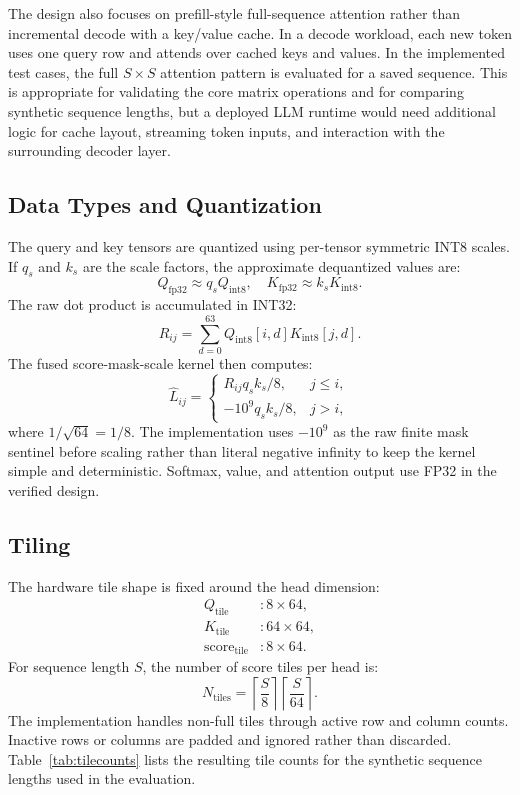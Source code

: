\documentclass[conference]{IMSTemplate}
\begin{document}
The design also focuses on prefill-style full-sequence attention rather than
incremental decode with a key/value cache. In a decode workload, each new token
uses one query row and attends over cached keys and values. In the implemented
test cases, the full \(S\times S\) attention pattern is evaluated for a saved
sequence. This is appropriate for validating the core matrix operations and for
comparing synthetic sequence lengths, but a deployed LLM runtime would need
additional logic for cache layout, streaming token inputs, and interaction with
the surrounding decoder layer.

\subsection{Data Types and Quantization}

The query and key tensors are quantized using per-tensor symmetric INT8 scales.
If \(q_s\) and \(k_s\) are the scale factors, the approximate dequantized values
are:
\[
    Q_{\mathrm{fp32}} \approx q_s Q_{\mathrm{int8}},
    \quad
    K_{\mathrm{fp32}} \approx k_s K_{\mathrm{int8}}.
\]
The raw dot product is accumulated in INT32:
\[
    R_{ij} = \sum_{d=0}^{63} Q_{\mathrm{int8}}[i,d]K_{\mathrm{int8}}[j,d].
\]
The fused score-mask-scale kernel then computes:
\[
    \hat{L}_{ij} =
    \begin{cases}
    R_{ij}q_s k_s / 8, & j \leq i,\\
    -10^9 q_s k_s / 8, & j > i,
    \end{cases}
\]
where \(1/\sqrt{64}=1/8\). The implementation uses \(-10^9\) as the raw
finite mask sentinel before scaling rather than literal negative infinity to
keep the kernel simple and deterministic. Softmax, value, and attention output
use FP32 in the verified design.

\subsection{Tiling}

The hardware tile shape is fixed around the head dimension:
\[
\begin{aligned}
Q_{\mathrm{tile}} &: 8 \times 64,\\
K_{\mathrm{tile}} &: 64 \times 64,\\
\mathrm{score}_{\mathrm{tile}} &: 8 \times 64.
\end{aligned}
\]
For sequence length \(S\), the number of score tiles per head is:
\[
    N_{\mathrm{tiles}} =
    \left\lceil \frac{S}{8} \right\rceil
    \left\lceil \frac{S}{64} \right\rceil .
\]
The implementation handles non-full tiles through active row and column counts.
Inactive rows or columns are padded and ignored rather than discarded.
Table~\ref{tab:tilecounts} lists the resulting tile counts for the synthetic
sequence lengths used in the evaluation.
\end{document}
